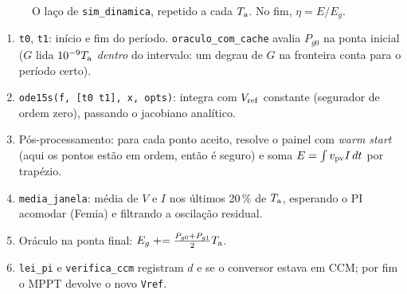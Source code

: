 \begin{figure}[htbp]
\centering
{}
\caption{O la\c{c}o de \texttt{sim\_dinamica}, repetido a cada $T_{\mathrm{a}}$. No fim, $\eta=E/E_g$.}
\label{fig:laco_sim}
\end{figure}


\begin{logica}
\begin{enumerate}
\item \texttt{t0}, \texttt{t1}: in\'icio e fim do per\'iodo. \texttt{oraculo\_com\_cache} avalia $P_{g0}$ na ponta inicial ($G$ lida $10^{-9}T_{\mathrm{a}}$ \emph{dentro} do intervalo: um degrau de $G$ na fronteira conta para o per\'iodo certo).
\item \texttt{ode15s(f, [t0 t1], x, opts)}: integra com $V_{\mathrm{ref}}$ constante (segurador de ordem zero), passando o jacobiano analítico.
\item P\'os-processamento: para cada ponto aceito, resolve o painel com \emph{warm start} (aqui os pontos est\~ao em ordem, ent\~ao \'e seguro) e soma $E=\int v_{\mathrm{pv}} I\,dt$ por trap\'ezio.
\item \texttt{media\_janela}: m\'edia de $V$ e $I$ nos \'ultimos 20\,\% de $T_{\mathrm{a}}$, esperando o PI acomodar (Femia) e filtrando a oscila\c{c}\~ao residual.
\item Or\'aculo na ponta final: $E_g\mathrel{+}=\frac{P_{g0}+P_{g1}}{2}T_{\mathrm{a}}$.
\item \texttt{lei\_pi} e \texttt{verifica\_ccm} registram $d$ e se o conversor estava em CCM; por fim o MPPT devolve o novo \texttt{Vref}.
\end{enumerate}
\end{logica}

